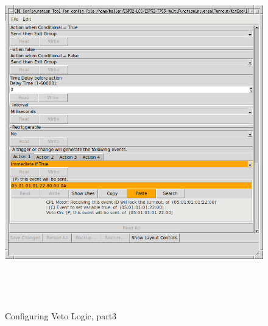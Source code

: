 \documentclass[12pt,twoside]{article}
\begin{document}
\begin{figure}[hbpt]\begin{centering}%
\includegraphics[height=6in]{ExampleSidingCP1-ConfigVetoLogic1c.png}
\caption{Configuring Veto Logic, part3}
\label{fig:ExampleSidingCP1-ConfigVetoLogic1c}
\end{centering}\end{figure}
\end{document}
